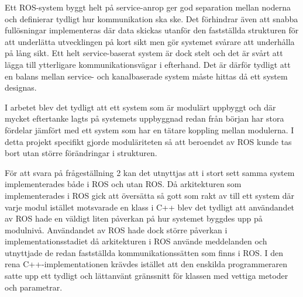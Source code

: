Ett ROS-system byggt helt på service-anrop ger god separation mellan noderna och definierar tydligt hur kommunikation ska ske. Det förhindrar även att snabba fullösningar implementeras där data skickas utanför den fastställda strukturen för att underlätta utvecklingen på kort sikt men gör systemet svårare att underhålla på lång sikt. Ett helt service-baserat system är dock stelt och det är svårt att lägga till ytterligare kommunikationsvägar i efterhand. Det är därför tydligt att en balans mellan service- och kanalbaserade system måste hittas då ett system designas.

I arbetet blev det tydligt att ett system som är modulärt uppbyggt och där mycket eftertanke lagts på systemets uppbyggnad redan från början har stora fördelar jämfört med ett system som har en tätare koppling mellan modulerna. I detta projekt specifikt gjorde moduläriteten så att beroendet av ROS kunde tas bort utan större förändringar i strukturen.

För att svara på frågeställning 2 kan det utnyttjas att i stort sett samma system implementerades både i ROS och utan ROS. Då arkitekturen som implementerades i ROS gick att översätta så gott som rakt av till ett system där varje modul istället motsvarade en klass i C++ blev det tydligt att användandet av ROS hade en väldigt liten påverkan på hur systemet byggdes upp på modulnivå. Användandet av ROS hade dock större påverkan i implementationsstadiet då arkitekturen i ROS använde meddelanden och utnyttjade de redan fastställda kommunikationssätten som finns i ROS. I den rena C++-implementationen krävdes istället att den enskilda programmeraren satte upp ett tydligt och lättanvänt gränssnitt för klassen med vettiga metoder och parametrar.

